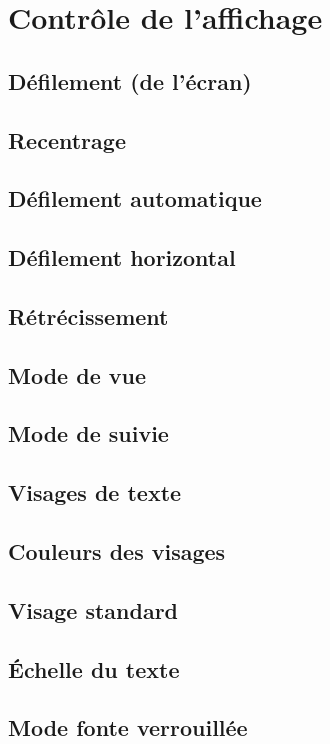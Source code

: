 \chapter{Contrôle de l'affichage}
\section{Défilement (de l'écran)}
\section{Recentrage}
\section{Défilement automatique}
\section{Défilement horizontal}
\section{Rétrécissement}
\section{Mode de vue}
\section{Mode de suivie}
\section{Visages de texte}
\section{Couleurs des visages}
\section{Visage standard}
\section{\'Echelle du texte}
\section{Mode fonte verrouillée}
